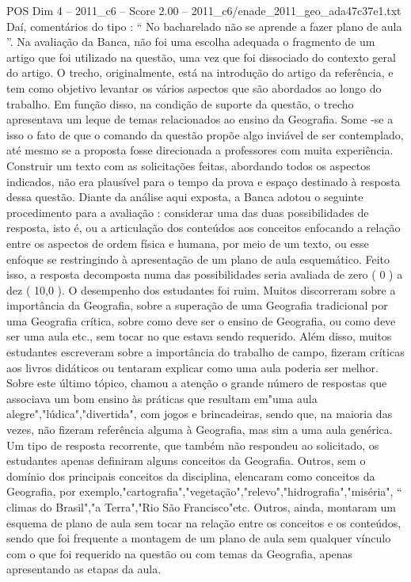 \begin{textsample}{POS Dim 4 – 2011\_c6 – Score 2.00 – 2011\_c6/enade\_2011\_geo\_ada47c37e1.txt}
Daí, comentários do tipo : “ No bacharelado não se aprende a fazer plano de aula ”.
Na avaliação da Banca, não foi uma escolha adequada o fragmento de um artigo que foi utilizado na questão, uma vez que foi dissociado do contexto geral do artigo.
O trecho, originalmente, está na introdução do artigo da referência, e tem como objetivo levantar os vários aspectos que são abordados ao longo do trabalho.
Em função disso, na condição de suporte da questão, o trecho apresentava um leque de temas relacionados ao ensino da Geografia.
Some -se a isso o fato de que o comando da questão propõe algo inviável de ser contemplado, até mesmo se a proposta fosse direcionada a professores com muita experiência.
Construir um texto com as solicitações feitas, abordando todos os aspectos indicados, não era plausível para o tempo da prova e espaço destinado à resposta dessa questão.
Diante da análise aqui exposta, a Banca adotou o seguinte procedimento para a avaliação : considerar uma das duas possibilidades de resposta, isto é, ou a articulação dos conteúdos aos conceitos enfocando a relação entre os aspectos de ordem física e humana, por meio de um texto, ou esse enfoque se restringindo à apresentação de um plano de aula esquemático.
Feito isso, a resposta decomposta numa das possibilidades seria avaliada de zero ( 0 ) a dez ( 10,0 ).
O desempenho dos estudantes foi ruim.
Muitos discorreram sobre a importância da Geografia, sobre a superação de uma Geografia tradicional por uma Geografia crítica, sobre como deve ser o ensino de Geografia, ou como deve ser uma aula etc., sem tocar no que estava sendo requerido.
Além disso, muitos estudantes escreveram sobre a importância do trabalho de campo, fizeram críticas aos livros didáticos ou tentaram explicar como uma aula poderia ser melhor.
Sobre este último tópico, chamou a atenção o grande número de respostas que associava um bom ensino às práticas que resultam em"uma aula alegre","lúdica","divertida", com jogos e brincadeiras, sendo que, na maioria das vezes, não fizeram referência alguma à Geografia, mas sim a uma aula genérica.
Um tipo de resposta recorrente, que também não respondeu ao solicitado, os estudantes apenas definiram alguns conceitos da Geografia.
Outros, sem o domínio dos principais conceitos da disciplina, elencaram como conceitos da Geografia, por exemplo,"cartografia","vegetação","relevo","hidrografia","miséria", “ climas do Brasil","a Terra","Rio São Francisco"etc.
Outros, ainda, montaram um esquema de plano de aula sem tocar na relação entre os conceitos e os conteúdos, sendo que foi frequente a montagem de um plano de aula sem qualquer vínculo com o que foi requerido na questão ou com temas da Geografia, apenas apresentando as etapas da aula.

\end{textsample}
